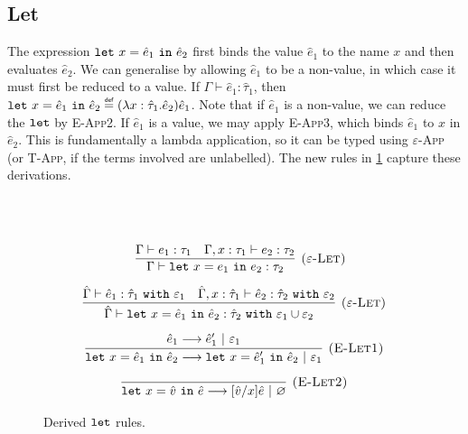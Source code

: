 \subsection{Let}

\noindent
The expression $\mathtt{let}~ x = \hat e_1~\mathtt{in}~ \hat e_2$ first binds the value $\hat e_1$ to the name $x$ and then evaluates $\hat e_2$. We can generalise by allowing $\hat e_1$ to be a non-value, in which case it must first be reduced to a value. If $\Gamma \vdash \hat e_1: \hat \tau_1$, then $\letxpr{x}{\hat e_1}{\hat e_2} \defn (\lambda x: \hat \tau_1 . \hat e_2) \hat e_1$. Note that if $\hat e_1$ is a non-value, we can reduce the $\mathtt{let}$ by \textsc{E-App2}. If $\hat e_1$ is a value, we may apply \textsc{E-App3}, which binds $\hat e_1$ to $x$ in $\hat e_2$. This is fundamentally a lambda application, so it can be typed using \textsc{$\varepsilon$-App} (or \textsc{T-App}, if the terms involved are unlabelled). The new rules in \ref{fig:let_rules} capture these derivations.

\begin{figure}[h]

 \\
 \\

\[
\begin{array}{c}

	~~~
	
	\infer[\textsc{($\varepsilon$-Let)}]
	{\Gamma \vdash \letxpr{x}{e_1}{e_2}: \tau_2}
	{\Gamma \vdash e_1: \tau_1 & \Gamma, x: \tau_1 \vdash e_2: \tau_2} \\[2ex]

\infer[\textsc{($\varepsilon$-Let)}]
	{\hat \Gamma \vdash \letxpr{x}{\hat e_1}{\hat e_2} : \hat \tau_2~\kw{with} \varepsilon_1 \cup \varepsilon_2}
	{\hat \Gamma \vdash \hat e_1 : \hat \tau_1~\kw{with} \varepsilon_1 & \hat \Gamma, x: \hat \tau_1 \vdash \hat e_2: \hat \tau_2~\kw{with} \varepsilon_2} \\[2ex]
	
\infer[\textsc{(E-Let1)}]
	{\letxpr{x}{\hat e_1}{\hat e_2} \longrightarrow \letxpr{x}{\hat e_1'}{\hat e_2}~|~\varepsilon_1}
	{\hat e_1 \longrightarrow \hat e_1'~|~\varepsilon_1} \\[2ex]
	
\infer[\textsc{(E-Let2)}]
	{\letxpr{x}{\hat v}{\hat e} \longrightarrow [\hat v/x]\hat e~|~\varnothing}
	{} 

\end{array}
\]

\caption{Derived $\mathtt{let}$ rules.}
\label{fig:let_rules}
\end{figure}

